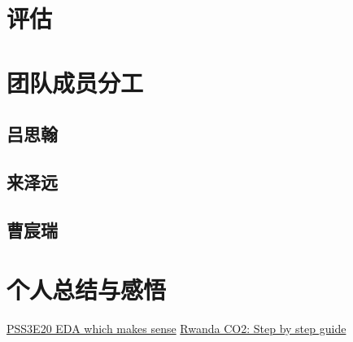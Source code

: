 \documentclass{ctexart}
\begin{document}



\section{评估}

\section{团队成员分工}

\subsection{吕思翰}

\subsection{来泽远}

\subsection{曹宸瑞}

\section{个人总结与感悟}

\begin{thebibliography}{100}
\href{https://www.kaggle.com/code/ambrosm/pss3e20-eda-which-makes-sense}{PSS3E20 EDA which makes sense}
\href{https://www.kaggle.com/code/kacperrabczewski/rwanda-co2-step-by-step-guide}{Rwanda CO2: Step by step guide}
\end{thebibliography}
\end{document}
